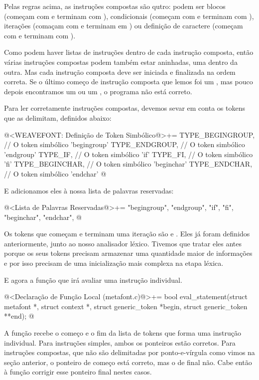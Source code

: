 Pelas regras acima, as instruções compostas são qutro: podem ser
blocos (começam com  e terminam
com ), condicionais (começam com 
e terminam com ), iterações (comaçam
com  e terminam em ) ou definição
de caractere (começam com  e terminam
com ).

Como podem haver listas de instruções dentro de cada instrução
composta, então várias instruções compostas podem também estar
aninhadas, uma dentro da outra. Mas cada instrução composta deve ser
iniciada e finalizada na ordem correta. Se o último começo de
instrução composta que lemos foi um , mas
pouco depois encontramos um  ou
um , o programa não está correto.

Para ler corretamente instruções compostas, devemos sevar em conta os
tokens que as delimitam, definidos abaixo:

\iniciocodigo
@<WEAVEFONT: Definição de Token Simbólico@>+=
TYPE_BEGINGROUP,            // O token simbólico 'begingroup'
TYPE_ENDGROUP,              // O token simbólico 'endgroup'
TYPE_IF,                    // O token simbólico 'if'
TYPE_FI,                    // O token simbólico 'fi'
TYPE_BEGINCHAR,             // O token simbólico 'beginchar'
TYPE_ENDCHAR,               // O token simbólico 'endchar'
@
\fimcodigo

E adicionamos eles à nossa lista de palavras reservadas:

\iniciocodigo
@<Lista de Palavras Reservadas@>+=
"begingroup", "endgroup", "if", "fi", "beginchar", "endchar",
@
\fimcodigo

Os tokens que começam e terminam uma iteração
são  e . Eles já foram
definidos anteriormente, junto ao nosso analisador léxico. Tivemos que
tratar eles antes porque os seus tokens precisam armazenar uma
quantidade maior de informações e por isso precisam de uma
inicialização mais complexa na etapa léxica.

E agora a função que irá avaliar uma instrução individual.

\iniciocodigo
@<Declaração de Função Local (metafont.c)@>+=
bool eval_statement(struct metafont *, struct context *,
                    struct generic_token *begin, struct generic_token **end);
@
\fimcodigo

A função recebe o começo e o fim da lista de tokens que forma uma
instrução individual. Para instruções simples, ambos os ponteiros
estão corretos. Para instruções compostas, que não são delimitadas por
ponto-e-vírgula como vimos na seção anterior, o ponteiro de começo
está correto, mas o de final não. Cabe então à
função  corrigir esse ponteiro final
nestes casos.

